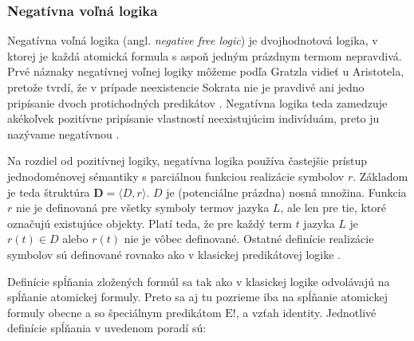 \documentclass[12pt, letterpaper]{article}
\begin{document}
\subsubsection{Negatívna voľná logika}
Negatívna voľná logika (angl. \textit{negative free logic}) je dvojhodnotová logika, v ktorej je každá atomická formula s aspoň jedným prázdnym termom nepravdivá. Prvé náznaky negatívnej voľnej logiky môžeme podľa Gratzla vidieť u Aristotela, pretože tvrdí, že v prípade neexistencie Sokrata nie je pravdivé ani jedno pripísanie dvoch protichodných predikátov \parencites[13b10--20]{Aristoteles}. Negatívna logika teda zamedzuje akékoľvek pozitívne pripísanie vlastností neexistujúcim indivíduám, preto ju nazývame negatívnou \parencites[155]{Dumitru2015}[331--332]{Gratzl2010}[225]{Lehmann2002}[2]{Morscher2001}[]{sep-logic-free}[293]{Priest_2008}.\par
Na rozdiel od pozitívnej logiky, negatívna logika používa častejšie prístup jednodoménovej sémantiky s parciálnou funkciou realizácie symbolov $r$. Základom je teda štruktúra $\textbf{D}=\langle D,r\rangle$. $D$ je (potenciálne prázdna) nosná množina. Funkcia $r$ nie je definovaná pre všetky symboly termov jazyka $L$, ale len pre tie, ktoré označujú existujúce objekty. Platí teda, že pre každý term $t$ jazyka $L$ je $r(t) \in D$ alebo $r(t)$ nie je vôbec definované. Ostatné definície realizácie symbolov sú definované rovnako ako v klasickej predikátovej logike \parencites[156]{Dumitru2015}[12]{Morscher2001}{sep-logic-free}.\par
Definície spĺňania zložených formúl sa tak ako v klasickej logike odvolávajú na spĺňanie atomickej formuly. Preto sa aj tu pozrieme iba na spĺňanie atomickej formuly obecne a so špeciálnym predikátom $\text{E}!$, a vzťah identity. Jednotlivé definície spĺňania v uvedenom poradí sú:

 
\end{document}
